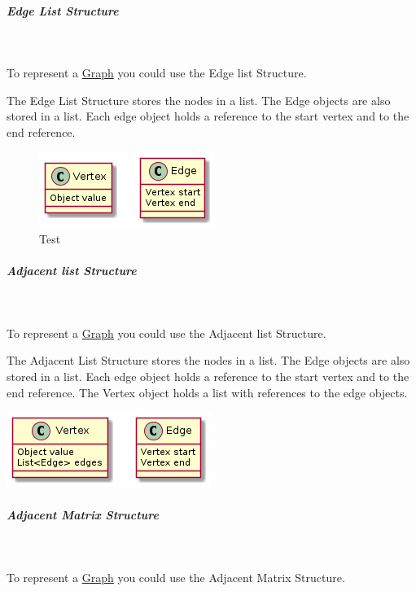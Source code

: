 \documentclass[11pt,twoside,twocolumn,landscape]{article}
\begin{document}
\subparagraph{Edge List Structure} \
\label{sec:orgd684a89}

To represent a \href{../../../roam/20220201163000-graph.org}{Graph} you could use the Edge list Structure.

The Edge List Structure stores the nodes in a list.
The Edge objects are also stored in a list.
Each edge object holds a reference to the start vertex and to the end reference.


\begin{figure}[htbp]
\centering
\includegraphics[width=.9\linewidth]{img/edge_list_structure.png}
\caption{Test}
\end{figure}


\subparagraph{Adjacent list Structure} \
\label{sec:org9cb8ca5}

To represent a \href{../../../roam/20220201163000-graph.org}{Graph} you could use the Adjacent list Structure.

The Adjacent List Structure stores the nodes in a list.
The Edge objects are also stored in a list.
Each edge object holds a reference to the start vertex and to the end reference.
The Vertex object holds a list with references to the edge objects.


\begin{center}
\includegraphics[width=.9\linewidth]{img/adjacent_list_structure.png}
\end{center}

\subparagraph{Adjacent Matrix Structure} \
\label{sec:org1588f4d}

To represent a \href{../../../roam/20220201163000-graph.org}{Graph} you could use the Adjacent Matrix Structure.
\end{document}
